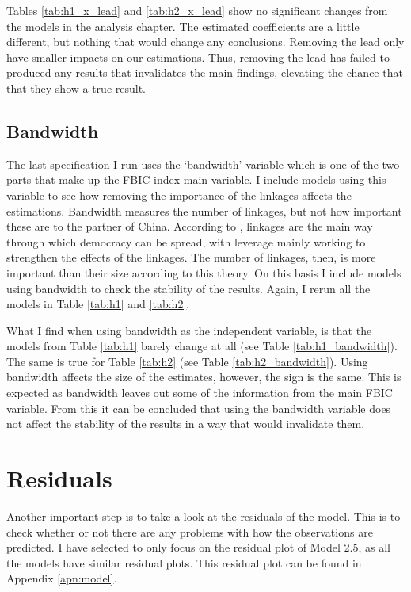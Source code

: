 Tables \ref{tab:h1_x_lead} and \ref{tab:h2_x_lead} show no significant changes from the models in the analysis chapter. The estimated coefficients are a little different, but nothing that would change any conclusions. Removing the lead only have smaller impacts on our estimations. Thus, removing the lead has failed to produced any results that invalidates the main findings, elevating the chance that that they show a true result. 

\subsection{Bandwidth}
The last specification I run uses the `bandwidth' variable which is one of the two parts that make up the FBIC index main variable. I include models using this variable to see how removing the importance of the linkages affects the estimations. Bandwidth measures the number of linkages, but not how important these are to the partner of China. According to \citet{levitsky_linkage_2006}, linkages are the main way through which democracy can be spread, with leverage mainly working to strengthen the effects of the linkages. The number of linkages, then, is more important than their size according to this theory. On this basis I include models using bandwidth to check the stability of the results. Again, I rerun all the models in Table \ref{tab:h1} and \ref{tab:h2}.

What I find when using bandwidth as the independent variable, is that the models from Table \ref{tab:h1} barely change at all (see Table \ref{tab:h1_bandwidth}). The same is true for Table \ref{tab:h2} (see Table \ref{tab:h2_bandwidth}). Using bandwidth affects the size of the estimates, however, the sign is the same. This is expected as bandwidth leaves out some of the information from the main FBIC variable. From this it can be concluded that using the bandwidth variable does not affect the stability of the results in a way that would invalidate them. 

\section{Residuals}
Another important step is to take a look at the residuals of the model. This is to check whether or not there are any problems with how the observations are predicted. I have selected to only focus on the residual plot of Model 2.5, as all the models have similar residual plots. This residual plot can be found in Appendix \ref{apn:model}.

